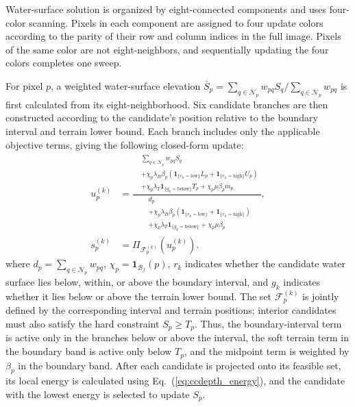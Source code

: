 \documentclass[authoryear,preprint,12pt]{elsarticle}
\begin{document}
Water-surface solution is organized by eight-connected components and uses four-color scanning. Pixels in each component are assigned to four update colors according to the parity of their row and column indices in the full image. Pixels of the same color are not eight-neighbors, and sequentially updating the four colors completes one sweep.

For pixel \(p\), a weighted water-surface elevation \(\bar S_p=\sum_{q\in\mathcal N_p}w_{pq}S_q/\sum_{q\in\mathcal N_p}w_{pq}\) is first calculated from its eight-neighborhood. Six candidate branches are then constructed according to the candidate's position relative to the boundary interval and terrain lower bound. Each branch includes only the applicable objective terms, giving the following closed-form update:
\begin{equation}\label{eq:ccdepth_update}
\begin{aligned}
u_p^{(k)}&=\frac{\begin{aligned}
 &\sum_{q\in\mathcal N_p}w_{pq}S_q\\
 &+\chi_p\lambda_B\beta_p\left(\mathbf{1}_{\{r_k=\mathrm{low}\}}L_p+\mathbf{1}_{\{r_k=\mathrm{high}\}}U_p\right)\\
 &+\chi_p\lambda_T\mathbf{1}_{\{g_k=\mathrm{below}\}}T_p+\chi_p\mu\beta_pm_p
 \end{aligned}}{\begin{aligned}
 &d_p\\
 &+\chi_p\lambda_B\beta_p\left(\mathbf{1}_{\{r_k=\mathrm{low}\}}+\mathbf{1}_{\{r_k=\mathrm{high}\}}\right)\\
 &+\chi_p\lambda_T\mathbf{1}_{\{g_k=\mathrm{below}\}}+\chi_p\mu\beta_p
 \end{aligned}},\\
s_p^{(k)}&=\Pi_{\mathcal F_p^{(k)}}\!\left(u_p^{(k)}\right).
\end{aligned}
\end{equation}
where \(d_p=\sum_{q\in\mathcal N_p}w_{pq}\), \(\chi_p=\mathbf{1}_{\mathcal B_f}(p)\), \(r_k\) indicates whether the candidate water surface lies below, within, or above the boundary interval, and \(g_k\) indicates whether it lies below or above the terrain lower bound. The set \(\mathcal F_p^{(k)}\) is jointly defined by the corresponding interval and terrain positions; interior candidates must also satisfy the hard constraint \(S_p\geq T_p\). Thus, the boundary-interval term is active only in the branches below or above the interval, the soft terrain term in the boundary band is active only below \(T_p\), and the midpoint term is weighted by \(\beta_p\) in the boundary band. After each candidate is projected onto its feasible set, its local energy is calculated using Eq.~(\ref{eq:ccdepth_energy}), and the candidate with the lowest energy is selected to update \(S_p\).
\end{document}
